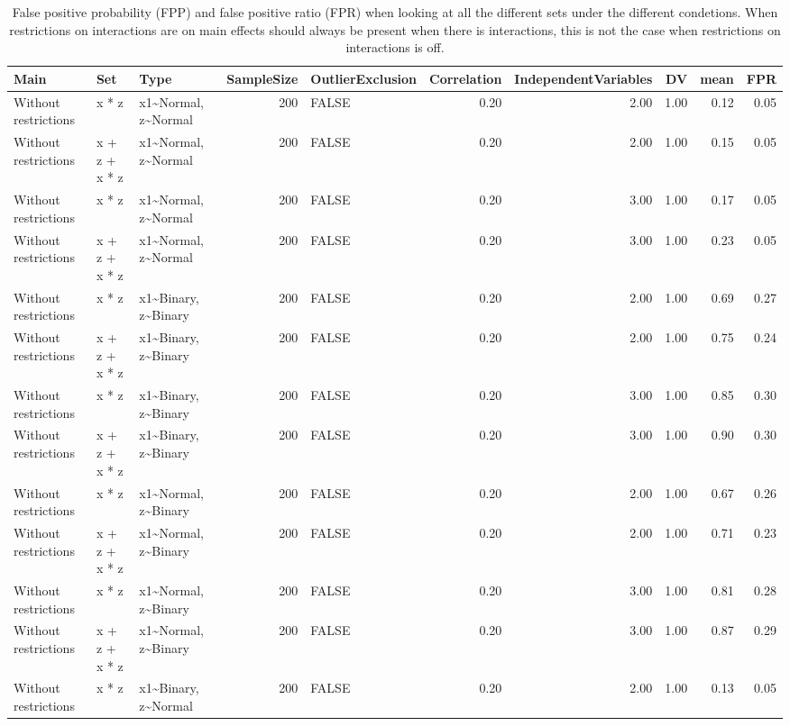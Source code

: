 \begin{longtable}{lllrlrrrrr}
\caption{False positive probability (FPP) and false positive ratio (FPR) when looking at all the different sets under the different condetions. When restrictions on interactions are on main effects should always be present when there is interactions, this is not the case when restrictions on interactions is off.} \\ 
  \hline
Main & Set & Type & SampleSize & OutlierExclusion & Correlation & IndependentVariables & DV & mean & FPR \\ 
  \hline
Without restrictions & x * z & x1\~{}Normal, z\~{}Normal & 200 & FALSE & 0.20 & 2.00 & 1.00 & 0.12 & 0.05 \\ 
  Without restrictions & x + z + x * z & x1\~{}Normal, z\~{}Normal & 200 & FALSE & 0.20 & 2.00 & 1.00 & 0.15 & 0.05 \\ 
  Without restrictions & x * z & x1\~{}Normal, z\~{}Normal & 200 & FALSE & 0.20 & 3.00 & 1.00 & 0.17 & 0.05 \\ 
  Without restrictions & x + z + x * z & x1\~{}Normal, z\~{}Normal & 200 & FALSE & 0.20 & 3.00 & 1.00 & 0.23 & 0.05 \\ 
  Without restrictions & x * z & x1\~{}Binary, z\~{}Binary & 200 & FALSE & 0.20 & 2.00 & 1.00 & 0.69 & 0.27 \\ 
  Without restrictions & x + z + x * z & x1\~{}Binary, z\~{}Binary & 200 & FALSE & 0.20 & 2.00 & 1.00 & 0.75 & 0.24 \\ 
  Without restrictions & x * z & x1\~{}Binary, z\~{}Binary & 200 & FALSE & 0.20 & 3.00 & 1.00 & 0.85 & 0.30 \\ 
  Without restrictions & x + z + x * z & x1\~{}Binary, z\~{}Binary & 200 & FALSE & 0.20 & 3.00 & 1.00 & 0.90 & 0.30 \\ 
  Without restrictions & x * z & x1\~{}Normal, z\~{}Binary & 200 & FALSE & 0.20 & 2.00 & 1.00 & 0.67 & 0.26 \\ 
  Without restrictions & x + z + x * z & x1\~{}Normal, z\~{}Binary & 200 & FALSE & 0.20 & 2.00 & 1.00 & 0.71 & 0.23 \\ 
  Without restrictions & x * z & x1\~{}Normal, z\~{}Binary & 200 & FALSE & 0.20 & 3.00 & 1.00 & 0.81 & 0.28 \\ 
  Without restrictions & x + z + x * z & x1\~{}Normal, z\~{}Binary & 200 & FALSE & 0.20 & 3.00 & 1.00 & 0.87 & 0.29 \\ 
  Without restrictions & x * z & x1\~{}Binary, z\~{}Normal & 200 & FALSE & 0.20 & 2.00 & 1.00 & 0.13 & 0.05 \\ 

\end{longtable}
